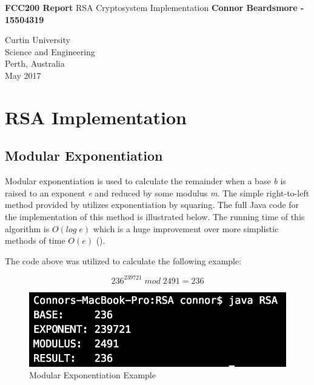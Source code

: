 \documentclass[]{article}
\begin{document}



\begin{titlepage}
	\begin{center}
		\vspace*{1cm}
		\LARGE\textbf{FCC200 Report}
		\break
		RSA Cryptosystem Implementation
		\vspace{1cm}
		\break
		\Large\textbf{Connor Beardsmore - 15504319} 
		\vspace{15cm}

		\normalsize
		Curtin University \\
		Science and Engineering \\
		Perth, Australia \\
	    May 2017
	    
	\end{center}
\end{titlepage}

\vspace*{-0.8cm}
\section*{\hfil RSA Implementation\hfil}

\subsection*{Modular Exponentiation}
\noindent
Modular exponentiation is used to calculate the remainder when a base \textit{b} is raised to an exponent \textit{e} and reduced by some modulus \textit{m}. The simple right-to-left method provided by \cite{alttext} utilizes exponentiation by squaring. The full Java code for the implementation of this method is illustrated below. The running time of this algorithm is $O(log\;e)$ which is a huge improvement over more simplistic methods of time $O(e)$ (\cite{maintext}).

\vspace{0.5cm}
{}

\noindent
The code above was utilized to calculate the following example:

$$236^{239721}\;mod\;2491=236$$

\begin{figure}[H]
	\centering
	\includegraphics[height=\textheight/10,width=\textwidth/4]{modularExpo.png}
	\caption{Modular Exponentiation Example}
	\centering
\end{figure}
\end{document}

